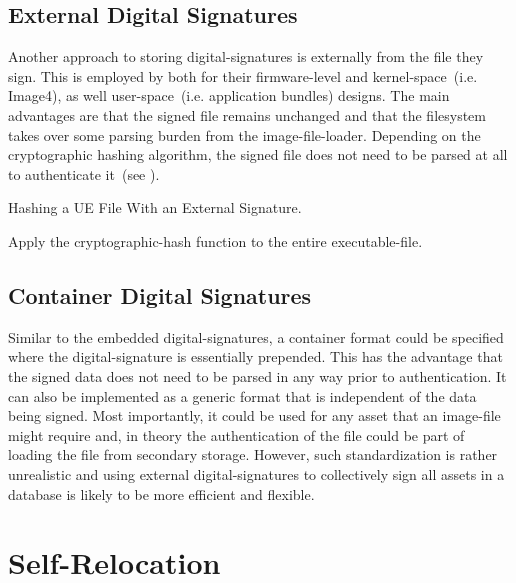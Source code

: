 \subsection{External Digital Signatures}

Another approach to storing \glspl{digital-signature} is externally from the file they sign. This is employed by  both for their \gls{firmware}-level and \gls{kernel-space}~(i.e.  Image4), as well user-space~(i.e.  application bundles) designs. The main advantages are that the signed file remains unchanged and that the filesystem takes over some parsing burden from the \gls{image-file-loader}. Depending on the cryptographic hashing algorithm, the signed file does not need to be parsed at all to authenticate it~(see ).

\begin{algorithm}
  \caption{Hashing a UE File With an External Signature.}
  \label{algo:dhash}
  \begin{algorithmic}[1]
    \State Apply the \gls{cryptographic-hash} function to the entire \gls{executable-file}.
  \end{algorithmic}
\end{algorithm}

\subsection{Container Digital Signatures}

Similar to the embedded \glspl{digital-signature}, a container format could be specified where the \gls{digital-signature} is essentially prepended. This has the advantage that the signed data does not need to be parsed in any way prior to authentication. It can also be implemented as a generic format that is independent of the data being signed. Most importantly, it could be used for any asset that an \gls{image-file} might require and, in theory the authentication of the file could be part of loading the file from secondary storage. However, such standardization is rather unrealistic and using external \glspl{digital-signature} to collectively sign all assets in a database is likely to be more efficient and flexible.

\section{Self-Relocation}

